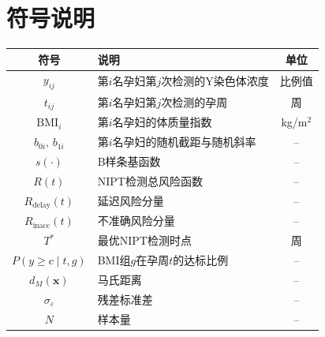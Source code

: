 \section{符号说明}

\begin{table}[H]
\centering
\begin{tabular}{clc}
\toprule
符号 & 说明 & 单位 \\
\midrule
$y_{ij}$ & 第$i$名孕妇第$j$次检测的Y染色体浓度 & 比例值 \\
$t_{ij}$ & 第$i$名孕妇第$j$次检测的孕周 & 周 \\
$\mathrm{BMI}_i$ & 第$i$名孕妇的体质量指数 & kg/m$^2$ \\
$b_{0i},\, b_{1i}$ & 第$i$名孕妇的随机截距与随机斜率 & -- \\
$s(\cdot)$ & B样条基函数 & -- \\
$R(t)$ & NIPT检测总风险函数 & -- \\
$R_{\text{delay}}(t)$ & 延迟风险分量 & -- \\
$R_{\text{inacc}}(t)$ & 不准确风险分量 & -- \\
$T^*$ & 最优NIPT检测时点 & 周 \\
$P(y \geq c \mid t, g)$ & BMI组$g$在孕周$t$的达标比例 & -- \\
$d_M(\mathbf{x})$ & 马氏距离 & -- \\
$\sigma_\varepsilon$ & 残差标准差 & -- \\
$N$ & 样本量 & -- \\
\bottomrule
\end{tabular}
\end{table}
